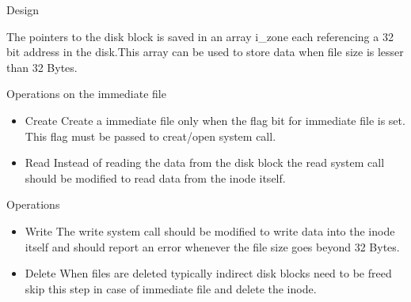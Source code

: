 \documentclass{beamer}
\begin{document}
%

\begin{frame}{Design}

The pointers to the disk block is saved in an array i\_zone each referencing a 32 bit address in the disk.This array can be used to store data when file size is lesser than 32 Bytes. 
\end{frame}


\begin{frame}{Operations on the immediate file}
\begin{itemize}
\item Create \linebreak
Create a immediate file only when the flag bit for immediate file is set. This flag must be passed to creat/open system call.\linebreak
\item Read \linebreak
Instead of reading the data from the disk block the read system call should be modified to read data from the inode itself. \linebreak
\end{itemize}
\end{frame}

\begin{frame}{Operations}
\begin{itemize}
\item Write \linebreak
The write system call should be modified to write data into the inode itself and should report an error whenever the file size goes beyond 32 Bytes.\linebreak
\item Delete	\linebreak
When files are deleted typically indirect disk blocks need to be freed skip this step in case of immediate file and delete the inode. \linebreak
\end{itemize}
\end{frame}





%
\end{document}
